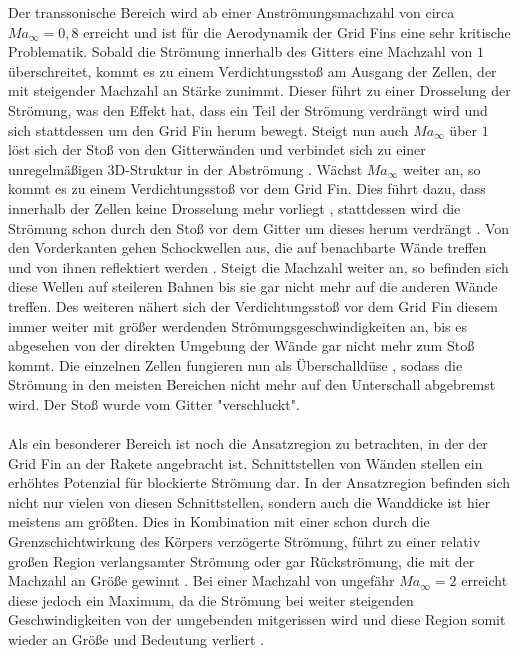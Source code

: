 Der transsonische Bereich wird ab einer Anströmungsmachzahl von circa $Ma_\infty=0,8$ erreicht \cite{machgrenzen} und ist für die Aerodynamik der Grid Fins eine sehr kritische Problematik. Sobald die Strömung innerhalb des Gitters eine Machzahl von $1$ überschreitet, kommt es zu einem Verdichtungsstoß am Ausgang der Zellen, der mit steigender Machzahl an Stärke zunimmt. Dieser führt zu einer Drosselung der Strömung, was den Effekt hat, dass ein Teil der Strömung verdrängt wird und sich stattdessen um den Grid Fin herum bewegt. Steigt nun auch $Ma_\infty$ über $1$ löst sich der Stoß von den Gitterwänden und verbindet sich zu einer unregelmäßigen 3D-Struktur in der Abströmung \cite{stroemung}. Wächst $Ma_\infty$ weiter an, so kommt es zu einem Verdichtungsstoß vor dem Grid Fin. Dies führt dazu, dass innerhalb der Zellen keine Drosselung mehr vorliegt \cite{stroemung}, stattdessen wird die Strömung schon durch den Stoß vor dem Gitter um dieses herum verdrängt \cite{synopsis}. Von den Vorderkanten gehen Schockwellen aus, die auf benachbarte Wände treffen und von ihnen reflektiert werden \cite{synopsis}. Steigt die Machzahl weiter an, so befinden sich diese Wellen auf steileren Bahnen bis sie gar nicht mehr auf die anderen Wände treffen. Des weiteren nähert sich der Verdichtungsstoß vor dem Grid Fin diesem immer weiter mit größer werdenden Strömungsgeschwindigkeiten an, bis es abgesehen von der direkten Umgebung der Wände gar nicht mehr zum Stoß kommt. Die einzelnen Zellen fungieren nun als Überschalldüse \cite{stroemung}, sodass die Strömung in den meisten Bereichen nicht mehr auf den Unterschall abgebremst wird. Der Stoß wurde vom Gitter "verschluckt".
\\~\\
Als ein besonderer Bereich ist noch die Ansatzregion zu betrachten, in der der Grid Fin an der Rakete angebracht ist. Schnittstellen von Wänden stellen ein erhöhtes Potenzial für blockierte Strömung dar. In der Ansatzregion befinden sich nicht nur vielen von diesen Schnittstellen, sondern auch die Wanddicke ist hier meistens am größten. Dies in Kombination mit einer schon durch die Grenzschichtwirkung des Körpers verzögerte Strömung, führt zu einer relativ großen Region verlangsamter Strömung oder gar Rückströmung, die mit der Machzahl an Größe gewinnt \cite{stroemung}. Bei einer Machzahl von ungefähr $Ma_\infty = 2$ erreicht diese jedoch ein Maximum, da die Strömung bei weiter steigenden Geschwindigkeiten von der umgebenden mitgerissen wird und diese Region somit wieder an Größe und Bedeutung verliert \cite{stroemung}.

